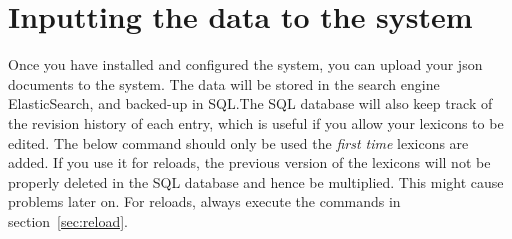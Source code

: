 \documentclass[
12pt, %
a4paper, %
oneside, %
headinclude,footinclude, %
BCOR0mm, %
]{scrartcl}
\begin{document}



\section{Inputting the data to the system}
\label{sec:input}
Once you have installed and configured the system, you can
upload your json documents to the system.  The data will be stored in the
search engine ElasticSearch, and backed-up in SQL.\@ The SQL database will also
keep track of the revision history of each entry, which is useful if you allow
your lexicons to be edited.
The below command should only be used the \textit{first time} lexicons are added.
If you
use it for reloads, the previous version of the lexicons will not be properly deleted
in the SQL database and hence be multiplied. This might cause problems later on.
For reloads, always execute the commands in section~\ref{sec:reload}.
\end{document}
